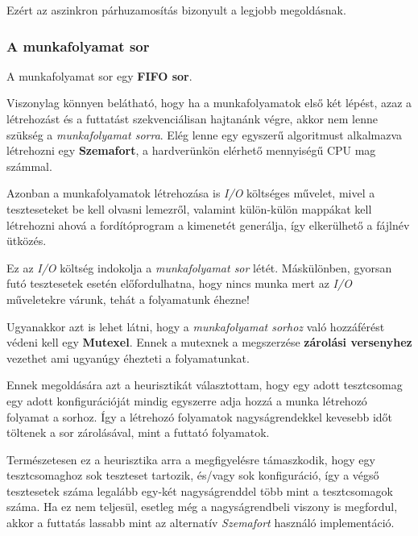         Ezért az aszinkron párhuzamosítás bizonyult a legjobb megoldásnak.

        \subsubsection{A munkafolyamat sor}

            A munkafolyamat sor egy \textbf{FIFO sor}.

            Viszonylag könnyen belátható, hogy ha a munkafolyamatok első két lépést, azaz a létrehozást és a futtatást
            szekvenciálisan hajtanánk végre, akkor nem lenne szükség a \textit{munkafolyamat sorra}. Elég lenne egy
            egyszerű algoritmust alkalmazva létrehozni egy \textbf{Szemafort}, a hardverünkön elérhető mennyiségű CPU
            mag számmal.

            Azonban a munkafolyamatok létrehozása is \textit{I/O} költséges művelet, mivel a teszteseteket be kell
            olvasni lemezről, valamint külön-külön mappákat kell létrehozni ahová a fordítóprogram a kimenetét
            generálja, így elkerülhető a fájlnév ütközés.

            Ez az \textit{I/O} költség indokolja a \textit{munkafolyamat sor} létét. Máskülönben, gyorsan futó
            tesztesetek esetén előfordulhatna, hogy nincs munka mert az \textit{I/O} műveletekre várunk, tehát a
            folyamatunk éhezne!

            Ugyanakkor azt is lehet látni, hogy a \textit{munkafolyamat sorhoz} való hozzáférést védeni kell egy
            \textbf{Mutexel}. Ennek a mutexnek a megszerzése \textbf{zárolási versenyhez} vezethet ami ugyanúgy
            éhezteti a folyamatunkat.

            Ennek megoldására azt a heurisztikát választottam, hogy egy adott tesztcsomag egy adott konfigurációját
            mindig egyszerre adja hozzá a munka létrehozó folyamat a sorhoz. Így a létrehozó folyamatok
            nagyságrendekkel kevesebb időt töltenek a sor zárolásával, mint a futtató folyamatok.

            Természetesen ez a heurisztika arra a megfigyelésre támaszkodik, hogy egy tesztcsomaghoz sok teszteset
            tartozik, és/vagy sok konfiguráció, így a végső tesztesetek száma legalább egy-két nagyságrenddel több mint
            a tesztcsomagok száma. Ha ez nem teljesül, esetleg még a nagyságrendbeli viszony is megfordul, akkor a
            futtatás lassabb mint az alternatív \textit{Szemafort} használó implementáció.

